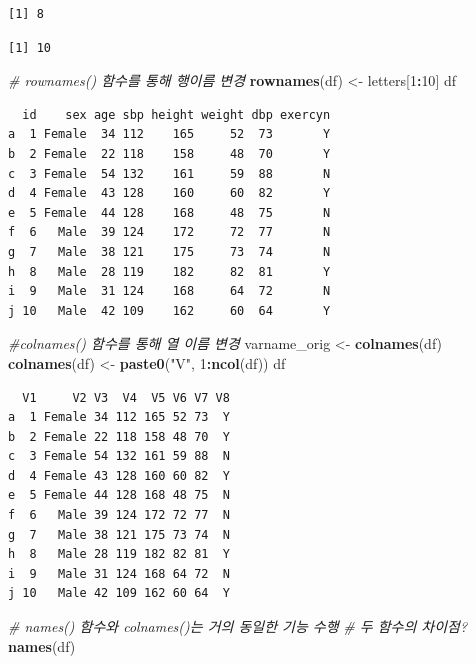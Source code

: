 \documentclass[
  11pt,
]{krantz}
\newenvironment{Shaded}{\begin{snugshade}}{\end{snugshade}}
\newcommand{\CommentTok}[1]{\textcolor[rgb]{0.37,0.37,0.37}{\textit{#1}}}
\newcommand{\DecValTok}[1]{\textcolor[rgb]{0.06,0.06,0.06}{#1}}
\newcommand{\KeywordTok}[1]{\textcolor[rgb]{0.27,0.27,0.27}{\textbf{#1}}}
\newcommand{\NormalTok}[1]{#1}
\newcommand{\OperatorTok}[1]{\textcolor[rgb]{0.43,0.43,0.43}{\textbf{#1}}}
\newcommand{\StringTok}[1]{\textcolor[rgb]{0.5,0.5,0.5}{#1}}
\begin{document}
\begin{verbatim}
[1] 8
\end{verbatim}

\begin{verbatim}
[1] 10
\end{verbatim}

\begin{Shaded}
\begin{Highlighting}[]
\CommentTok{# rownames() 함수를 통해 행이름 변경}
\KeywordTok{rownames}\NormalTok{(df) <-}\StringTok{ }\NormalTok{letters[}\DecValTok{1}\OperatorTok{:}\DecValTok{10}\NormalTok{]}
\NormalTok{df}
\end{Highlighting}
\end{Shaded}

\begin{verbatim}
  id    sex age sbp height weight dbp exercyn
a  1 Female  34 112    165     52  73       Y
b  2 Female  22 118    158     48  70       Y
c  3 Female  54 132    161     59  88       N
d  4 Female  43 128    160     60  82       Y
e  5 Female  44 128    168     48  75       N
f  6   Male  39 124    172     72  77       N
g  7   Male  38 121    175     73  74       N
h  8   Male  28 119    182     82  81       Y
i  9   Male  31 124    168     64  72       N
j 10   Male  42 109    162     60  64       Y
\end{verbatim}

\begin{Shaded}
\begin{Highlighting}[]
\CommentTok{#colnames() 함수를 통해 열 이름 변경}
\NormalTok{varname_orig <-}\StringTok{ }\KeywordTok{colnames}\NormalTok{(df)}
\KeywordTok{colnames}\NormalTok{(df) <-}\StringTok{ }\KeywordTok{paste0}\NormalTok{(}\StringTok{"V"}\NormalTok{, }\DecValTok{1}\OperatorTok{:}\KeywordTok{ncol}\NormalTok{(df))}
\NormalTok{df}
\end{Highlighting}
\end{Shaded}

\begin{verbatim}
  V1     V2 V3  V4  V5 V6 V7 V8
a  1 Female 34 112 165 52 73  Y
b  2 Female 22 118 158 48 70  Y
c  3 Female 54 132 161 59 88  N
d  4 Female 43 128 160 60 82  Y
e  5 Female 44 128 168 48 75  N
f  6   Male 39 124 172 72 77  N
g  7   Male 38 121 175 73 74  N
h  8   Male 28 119 182 82 81  Y
i  9   Male 31 124 168 64 72  N
j 10   Male 42 109 162 60 64  Y
\end{verbatim}

\begin{Shaded}
\begin{Highlighting}[]
\CommentTok{# names() 함수와 colnames()는 거의 동일한 기능 수행}
\CommentTok{# 두 함수의 차이점? }
\KeywordTok{names}\NormalTok{(df)}
\end{Highlighting}
\end{Shaded}
\end{document}
